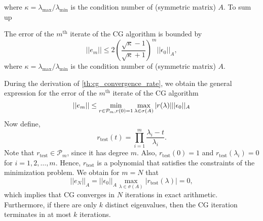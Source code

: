 where $\kappa = \lambda_{\text{max}}/\lambda_{\text{min}}$ is the condition number of (symmetric matrix) $A$. To sum up
\begin{theorem}
  The error of the $m^{\text{th}}$ iterate of the CG algorithm is bounded by
  \begin{equation}
    ||e_m|| \leq 2 \left(\frac{\sqrt{\kappa}-1}{\sqrt{\kappa} + 1}\right)^m ||\epsilon_0||_A,
    \label{eq:cg_convergence_rate}
  \end{equation}
  where $\kappa = \lambda_{\text{max}}/\lambda_{\text{min}}$ is the condition number of (symmetric matrix) $A$.
  \label{th:cg_convergence_rate}
\end{theorem}
During the derivation of \cref{th:cg_convergence_rate}, we obtain the general expression for the error of the $m^{\text{th}}$ iterate of the CG algorithm
\[
  || e_m|| \leq \min_{r \in \mathcal{P}_{m}, r(0) = 1} \max_{\lambda \in \sigma(A)} |r(\lambda)| ||\epsilon_0||_A \\
\]
Now define,
\[
  r_{\textrm{test}}(t) = \prod_{i=1}^m \frac{\lambda_i - t}{\lambda_i}.
\]
Note that $r_{\textrm{test}}\in\mathcal{P}_m$, since it has degree $m$. Also, $r_{\textrm{test}}(0) = 1$ and $r_{\textrm{test}}(\lambda_i) = 0$ for $i = 1, 2, \dots, m$. Hence, $r_{\textrm{test}}$ is a polynomial that satisfies the constraints of the minimization problem. We obtain for $m = N$ that
\[
  ||e_N||_A = ||\epsilon_0||_A \max_{\lambda \in \sigma(A)} |r_{\textrm{test}}(\lambda)| = 0,
\]
which implies that CG converges in $N$ iterations in exact arithmetic. Furthermore, if there are only $k$ distinct eigenvalues, then the CG iteration terminates in at most $k$ iterations.

